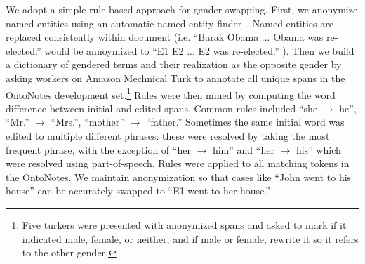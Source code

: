We adopt a simple rule based approach for gender swapping. 
First, we anonymize named entities using an automatic named entity finder~\cite{lample2016neural}. Named entities are replaced consistently within document (i.e. ``Barak Obama ... Obama was re-elected.'' would be annoymized to ``E1 E2 ... E2 was re-elected.'' ).
Then we build a dictionary of gendered terms and their realization as the opposite gender by asking workers on Amazon Mechnical Turk to annotate all unique spans in the OntoNotes development set.\footnote{Five turkers were presented with anonymized spans and asked to mark if it indicated male, female, or neither, and if male or female, rewrite it so it refers to the other gender.}
Rules were then mined by computing the word difference between initial and edited spans.
Common rules included ``she $\rightarrow$ he'', ``Mr.'' $\rightarrow$ ``Mrs.'', ``mother'' $\rightarrow$ ``father.''
Sometimes the same initial word was edited to multiple different phrases: these were resolved by taking the most frequent phrase, with the exception of ``her $\rightarrow$ him'' and ``her $\rightarrow$ his'' which were resolved using part-of-speech.
Rules were applied to all matching tokens in the OntoNotes. We maintain anonymization so that cases like ``John went to his house'' can be accurately swapped to ``E1 went to her house.''




